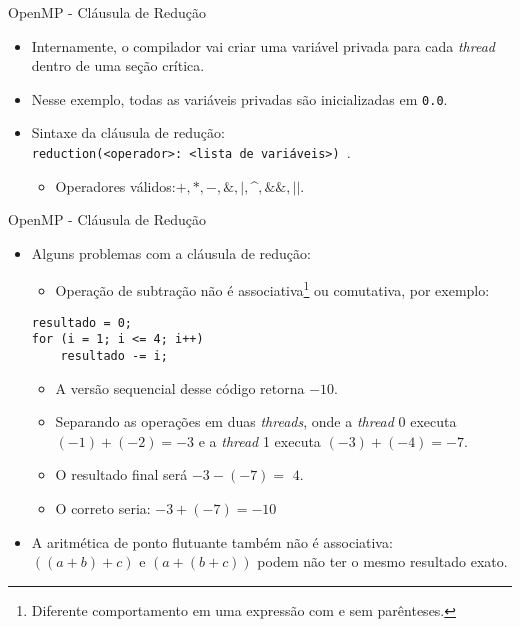 \begin{frame}{OpenMP - Cláusula de Redução}
\begin{itemize}
	\item Internamente, o compilador vai criar uma variável privada para cada \textit{thread} dentro de uma seção crítica.
	\medskip
	\pause
	\item Nesse exemplo, todas as variáveis privadas são inicializadas em \texttt{0.0}.
	\medskip
	\pause
	\item Sintaxe da cláusula de redução:\\ \texttt{reduction(<operador>: <lista de variáveis>) }.
	\smallskip
	\begin{itemize}
		\item Operadores válidos:$ +, *, -, \&, |, $\textasciicircum$, \&\&, ||$.
	\end{itemize}
\end{itemize}
\end{frame}

\begin{frame}[fragile]{OpenMP - Cláusula de Redução}
\begin{itemize}
	\item Alguns problemas com a cláusula de redução:
	\medskip
	\begin{itemize}
		\item Operação de subtração não é associativa\footnote{Diferente comportamento em uma expressão com e sem parênteses.} ou comutativa, por exemplo:
	\end{itemize}
\fontsize{8pt}{7.2}\selectfont
\begin{lstlisting}
resultado = 0;
for (i = 1; i <= 4; i++)
	resultado -= i;
\end{lstlisting}
\fontsize{10pt}{7.2}\selectfont
	\begin{itemize}
		\item A versão sequencial desse código retorna $-10$.
		\medskip
		\item Separando as operações em duas \textit{threads}, onde a \textit{thread} 0 executa $(-1) + (-2)  =-3$ e a \textit{thread} 1 executa $(-3) + (-4)=-7$.
		\medskip
		\item O resultado final será $-3-(-7) =$ {\color{bostonuniversityred}$4$}.
		\medskip
		\item O correto seria: $-3+(-7) = -10$
	\end{itemize}	
\bigskip
\pause
\item A aritmética de ponto flutuante também não é associativa:\\ $((a + b) + c)$ e $(a +(b + c))$ podem não ter o mesmo resultado exato.
\end{itemize}
\end{frame}
